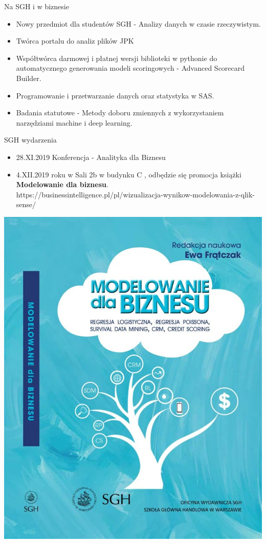 \documentclass{beamer}
\begin{document}
\begin{frame}{Na SGH i w biznesie}

\begin{itemize}
\item Nowy przedmiot dla studentów SGH - Analizy danych w czasie rzeczywistym.
\item Twórca portalu do analiz plików JPK
\item Współtwórca darmowej i płatnej wersji biblioteki w pythonie do automatycznego generowania modeli scoringowych - Advanced Scorecard Builder.
\item Programowanie i przetwarzanie danych oraz statystyka w SAS. 
\item Badania statutowe - Metody doboru zmiennych z wykorzystaniem narzędziami machine i deep learning.
\end{itemize}
\end{frame}
\begin{frame}{SGH wydarzenia}
\begin{itemize}
\item 28.XI.2019 Konferencja - Analityka dla Biznesu
\item 4.XII.2019 roku w Sali 2b w budynku C , odbędzie się promocja książki {\bf Modelowanie dla biznesu}.\\ {\tiny  https://businessintelligence.pl/pl/wizualizacja-wynikow-modelowania-z-qlik-sense/  }
\end{itemize}
\begin{center}
\includegraphics[scale=0.1]{book} 
\end{center}
\end{frame}
\end{document}
